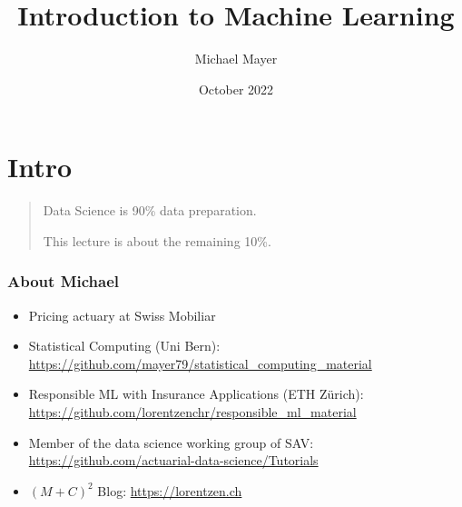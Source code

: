 \documentclass[
    utf8,
    aspectratio=169
]{beamer}  %
\title{Introduction to Machine Learning}
\author{Michael Mayer}
\date{October 2022}
\begin{document}

\frame{\titlepage}


\section{Intro}

\begin{frame}
\begin{quotation}
	\begin{huge}
		\begin{center}
			Data Science is 90\% data preparation.
	
			This lecture is about the remaining 10\%.
		\end{center}
	\end{huge}
\end{quotation}
\end{frame}

\begin{frame}
	\frametitle{About Michael}
	\begin{itemize}
		\item Pricing actuary at Swiss Mobiliar
		\item Statistical Computing (Uni Bern): \url{https://github.com/mayer79/statistical_computing_material}
		\item Responsible ML with Insurance Applications (ETH Zürich): \url{https://github.com/lorentzenchr/responsible_ml_material}
		\item Member of the data science working group of SAV: \url{https://github.com/actuarial-data-science/Tutorials}
		\item $(M+C)^2$ Blog: \url{https://lorentzen.ch}
	\end{itemize}
\end{frame}
\end{document}
